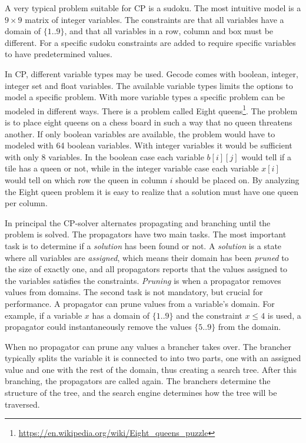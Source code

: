 \documentclass[a4paper,11pt]{article}
\begin{document}
A very typical problem suitable for CP is a sudoku. The most intuitive model is a $9\times9$ matrix of integer variables. The constraints are that all variables have a domain of $\{1..9\}$, and that all variables in a row, column and box must be different. For a specific sudoku constraints are added to require specific variables to have predetermined values.

In CP, different variable types may be used. Gecode comes with boolean, integer, integer set and float variables. The available variable types limits the options to model a specific problem. With more variable types a specific problem can be modeled in different ways. There is a problem called Eight queens\footnote{\url{https://en.wikipedia.org/wiki/Eight_queens_puzzle}}. The problem is to place eight queens on a chess board in such a way that no queen threatens another. If only boolean variables are available, the problem would have to modeled with 64 boolean variables. With integer variables it would be sufficient with only 8 variables. In the boolean case each variable $b[i][j]$ would tell if a tile has a queen or not, while in the integer variable case each variable $x[i]$ would tell on which row the queen in column $i$ should be placed on. By analyzing the Eight queen problem it is easy to realize that a solution must have one queen per column.

In principal the CP-solver alternates propagating and branching until the problem is solved. The propagators have two main tasks. The most important task is to determine if a \textit{solution} has been found or not. A \textit{solution} is a state where all variables are \textit{assigned}, which means their domain has been \textit{pruned} to the size of exactly one, and all propagators reports that the values assigned to the variables satisfies the constraints. \textit{Pruning} is when a propagator removes values from domains. The second task is not mandatory, but crucial for performance. A propagator can prune values from a variable's domain. For example, if a variable $x$ has a domain of $\{1..9\}$ and the constraint $x\le 4$ is used, a propagator could instantaneously remove the values $\{5..9\}$ from the domain.

When no propagator can prune any values a brancher takes over. The brancher typically splits the variable it is connected to into two parts, one with an assigned value and one with the rest of the domain, thus creating a search tree. After this branching, the propagators are called again. The branchers determine the structure of the tree, and the search engine determines how the tree will be traversed. 
\end{document}
